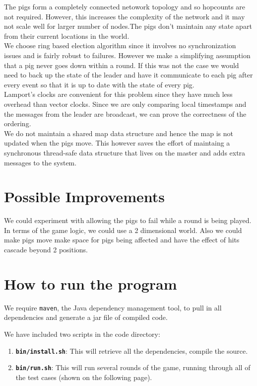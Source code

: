\documentclass[]{article}
\begin{document}
The pigs form a completely connected netowork topology and so hopcounts are 
not required. However, this increases the complexity of the network and it may not scale well 
for larger number of nodes.The pigs don't maintain any state apart from their current
locations in the world.\\
We choose ring based election algorithm since it involves no synchronization issues and
is fairly robust to failures. However we make a simplifying assumption that a pig never goes down 
within a round. If this was not the case we would need to back up the state of the leader and have 
it communicate to each pig after every event so that it is up to date with the state of every pig.\\
Lamport's clocks are convenient for this problem since they have much less 
overhead than vector clocks. Since we are only comparing local timestamps and
the messages from the leader are broadcast, we can prove the correctness of the ordering.\\
We do not maintain a shared map data structure and hence the map is not
updated when the pigs move. This however saves the effort of maintaing a
synchronous thread-safe data structure that lives on the master and adds
extra messages to the system.

\section{Possible Improvements}

We could experiment with allowing the pigs to fail while a round is being played. 
In terms of the game logic, we could use a 2
dimensional world. Also we could make pigs move make space for pigs
being affected and have the effect of hits cascade beyond 2 positions.

\section{How to run the program}

We require \texttt{maven}, the Java dependency management tool, to pull
in all dependencies and generate a jar file of compiled code.

We have included two scripts in the code directory:

\begin{enumerate}[1.]
\item
  \textbf{\texttt{bin/install.sh}}: This will retrieve all the
  dependencies, compile the source.
\item
  \textbf{\texttt{bin/run.sh}}: This will run several rounds of the
  game, running through all of the test cases (shown on the following
  page).
\end{enumerate}
\end{document}
